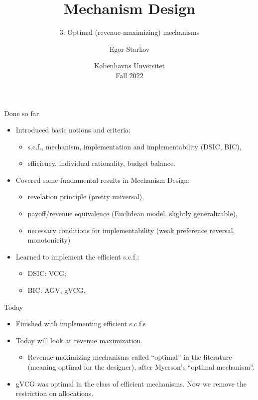 \documentclass[english,10pt
,aspectratio=169
]{beamer}
\title{Mechanism Design}
\subtitle{3: Optimal (revenue-maximizing) mechanisms}
\author{Egor Starkov}
\date{K{\o}benhavns Unversitet \\
	Fall 2022}
\begin{document}
	\frame[plain]{\titlepage}



\begin{frame}{Done so far}
\begin{itemize}
	\item Introduced basic notions and criteria:
	\begin{itemize}
		\item s.c.f., mechanism, implementation and implementability (DSIC, BIC),
		\item efficiency, individual rationality, budget balance.
	\end{itemize}
	\pause
	\item Covered some fundamental results in Mechanism Design:
	\begin{itemize}
		\item revelation principle (pretty universal),
		\item payoff/revenue equivalence (Euclidean model, slightly generalizable),
		\item necessary conditions for implementability (weak preference reversal, monotonicity)
	\end{itemize}
	\pause
	\item Learned to implement the efficient s.c.f.:
	\begin{itemize}
		\item DSIC: VCG;
		\item BIC: AGV, gVCG.
	\end{itemize}
\end{itemize}
\end{frame}


\begin{frame}{Today}
\begin{itemize}
	\item Finished with implementing efficient s.c.f.s
	\item Today will look at revenue maximization.
	\begin{itemize}
		\item Revenue-maximizing mechanisms called ``optimal'' in the literature (meaning optimal for the designer), after Myerson's ``optimal mechanism''.
	\end{itemize}
	\item gVCG was optimal in the class of efficient mechanisms. Now we remove the restriction on allocations.
\end{itemize}
\end{frame}
\end{document}
